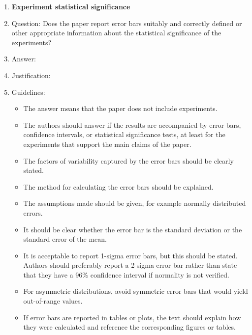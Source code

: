 \begin{enumerate}
\item {\bf Experiment statistical significance}
    \item[] Question: Does the paper report error bars suitably and correctly defined or other appropriate information about the statistical significance of the experiments?
    \item[] Answer: \answerTODO{}
    \item[] Justification: \justificationTODO{}
    \item[] Guidelines:
    \begin{itemize}
        \item The answer \answerNA{} means that the paper does not include experiments.
        \item The authors should answer \answerYes{} if the results are accompanied by error bars, confidence intervals, or statistical significance tests, at least for the experiments that support the main claims of the paper.
        \item The factors of variability captured by the error bars should be clearly stated.
        \item The method for calculating the error bars should be explained.
        \item The assumptions made should be given, for example normally distributed errors.
        \item It should be clear whether the error bar is the standard deviation or the standard error of the mean.
        \item It is acceptable to report 1-sigma error bars, but this should be stated. Authors should preferably report a 2-sigma error bar rather than state that they have a 96\% confidence interval if normality is not verified.
        \item For asymmetric distributions, avoid symmetric error bars that would yield out-of-range values.
        \item If error bars are reported in tables or plots, the text should explain how they were calculated and reference the corresponding figures or tables.
    \end{itemize}


\end{enumerate}
